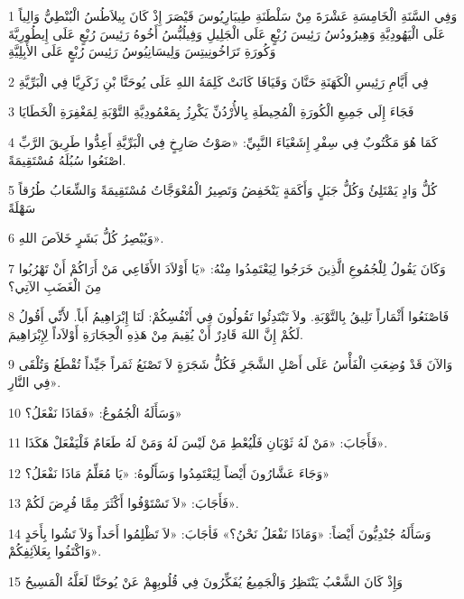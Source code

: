 \par 1 وَفِي السَّنَةِ الْخَامِسَةِ عَشْرَةَ مِنْ سَلْطَنَةِ طِيبَارِيُوسَ قَيْصَرَ إِذْ كَانَ بِيلاَطُسُ الْبُنْطِيُّ وَالِياً عَلَى الْيَهُودِيَّةِ وَهِيرُودُسُ رَئِيسَ رُبْعٍ عَلَى الْجَلِيلِ وَفِيلُبُّسُ أَخُوهُ رَئِيسَ رُبْعٍ عَلَى إِيطُورِيَّةَ وَكُورَةِ تَرَاخُونِيتِسَ وَلِيسَانِيُوسُ رَئِيسَ رُبْعٍ عَلَى الأَبِلِيَّةِ
\par 2 فِي أَيَّامِ رَئِيسِ الْكَهَنَةِ حَنَّانَ وَقَيَافَا كَانَتْ كَلِمَةُ اللهِ عَلَى يُوحَنَّا بْنِ زَكَرِيَّا فِي الْبَرِّيَّةِ
\par 3 فَجَاءَ إِلَى جَمِيعِ الْكُورَةِ الْمُحِيطَةِ بِالأُرْدُنِّ يَكْرِزُ بِمَعْمُودِيَّةِ التَّوْبَةِ لِمَغْفِرَةِ الْخَطَايَا
\par 4 كَمَا هُوَ مَكْتُوبٌ فِي سِفْرِ إِشَعْيَاءَ النَّبِيِّ: «صَوْتُ صَارِخٍ فِي الْبَرِّيَّةِ أَعِدُّوا طَرِيقَ الرَّبِّ اصْنَعُوا سُبُلَهُ مُسْتَقِيمَةً.
\par 5 كُلُّ وَادٍ يَمْتَلِئُ وَكُلُّ جَبَلٍ وَأَكَمَةٍ يَنْخَفِضُ وَتَصِيرُ الْمُعْوَجَّاتُ مُسْتَقِيمَةً وَالشِّعَابُ طُرُقاً سَهْلَةً
\par 6 وَيُبْصِرُ كُلُّ بَشَرٍ خَلاَصَ اللهِ».
\par 7 وَكَانَ يَقُولُ لِلْجُمُوعِ الَّذِينَ خَرَجُوا لِيَعْتَمِدُوا مِنْهُ: «يَا أَوْلاَدَ الأَفَاعِي مَنْ أَرَاكُمْ أَنْ تَهْرُبُوا مِنَ الْغَضَبِ الآتِي؟
\par 8 فَاصْنَعُوا أَثْمَاراً تَلِيقُ بِالتَّوْبَةِ. ولاَ تَبْتَدِئُوا تَقُولُونَ فِي أَنْفُسِكُمْ: لَنَا إِبْرَاهِيمُ أَباً. لأَنِّي أَقُولُ لَكُمْ إِنَّ اللهَ قَادِرٌ أَنْ يُقِيمَ مِنْ هَذِهِ الْحِجَارَةِ أَوْلاَداً لِإِبْرَاهِيمَ.
\par 9 وَالآنَ قَدْ وُضِعَتِ الْفَأْسُ عَلَى أَصْلِ الشَّجَرِ فَكُلُّ شَجَرَةٍ لاَ تَصْنَعُ ثَمَراً جَيِّداً تُقْطَعُ وَتُلْقَى فِي النَّارِ».
\par 10 وَسَأَلَهُ الْجُمُوعُ: «فَمَاذَا نَفْعَلُ؟»
\par 11 فَأَجَابَ: «مَنْ لَهُ ثَوْبَانِ فَلْيُعْطِ مَنْ لَيْسَ لَهُ وَمَنْ لَهُ طَعَامٌ فَلْيَفْعَلْ هَكَذَا».
\par 12 وَجَاءَ عَشَّارُونَ أَيْضاً لِيَعْتَمِدُوا وَسَأَلُوهُ: «يَا مُعَلِّمُ مَاذَا نَفْعَلُ؟»
\par 13 فَأَجَابَ: «لاَ تَسْتَوْفُوا أَكْثَرَ مِمَّا فُرِضَ لَكُمْ».
\par 14 وَسَأَلَهُ جُنْدِيُّونَ أَيْضاً: «وَمَاذَا نَفْعَلُ نَحْنُ؟» فَأجَابَ: «لاَ تَظْلِمُوا أَحَداً وَلاَ تَشُوا بِأَحَدٍ وَاكْتَفُوا بِعَلاَئِفِكُمْ».
\par 15 وَإِذْ كَانَ الشَّعْبُ يَنْتَظِرُ وَالْجَمِيعُ يُفَكِّرُونَ فِي قُلُوبِهِمْ عَنْ يُوحَنَّا لَعَلَّهُ الْمَسِيحُ
